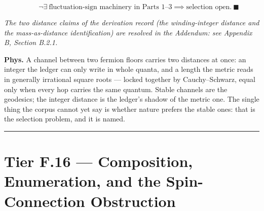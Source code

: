 \begin{theorem}
\[
\qquad \neg\exists\ \text{fluctuation-sign machinery in Parts 1–3}\implies\text{selection open}.\ \blacksquare
\]

\textit{The two distance claims of the derivation record (the winding-integer distance and the mass-as-distance identification) are resolved in the Addendum: see Appendix B, Section B.2.1.}

\textbf{Phys.} A channel between two fermion floors carries two distances at once: an integer the ledger can only write in whole quanta, and a length the metric reads in generally irrational square roots — locked together by Cauchy–Schwarz, equal only when every hop carries the same quantum. Stable channels are the geodesics; the integer distance is the ledger's shadow of the metric one. The single thing the corpus cannot yet say is whether nature prefers the stable ones: that is the selection problem, and it is named.

\vspace{2pt}\noindent\rule{\textwidth}{0.4pt}\vspace{2pt}

\end{theorem}

\section[Tier F.16 — Composition, Enumeration, and the…]{\texorpdfstring{Tier F.16 — Composition, Enumeration, and the Spin-Connection Obstruction}{Tier F.16 - Composition, Enumeration, and the Spin-Connection Obstruction}}

